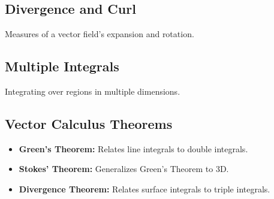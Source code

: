 \documentclass[12pt,a4paper]{article}
\begin{document}
\subsection{Divergence and Curl}
Measures of a vector field's expansion and rotation.

\subsection{Multiple Integrals}
Integrating over regions in multiple dimensions.

\subsection{Vector Calculus Theorems}

\begin{tcolorbox}[colback=red!5!white,colframe=red!75!black,title=Important Theorems]
\begin{itemize}
    \item \textbf{Green's Theorem:} Relates line integrals to double integrals.
    \item \textbf{Stokes' Theorem:} Generalizes Green's Theorem to 3D.
    \item \textbf{Divergence Theorem:} Relates surface integrals to triple integrals.
\end{itemize}
\end{tcolorbox}
\end{document}
